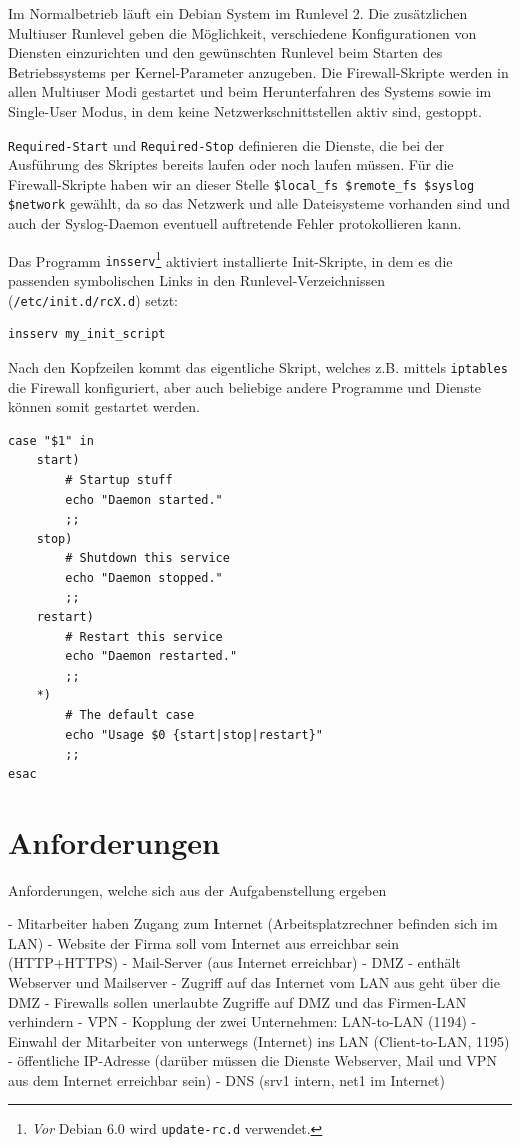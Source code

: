 \noindent Im Normalbetrieb läuft ein Debian System im Runlevel 2.
Die zusätzlichen Multiuser Runlevel geben die Möglichkeit, verschiedene
Konfigurationen von Diensten einzurichten und den gewünschten Runlevel beim
Starten des Betriebssystems per Kernel-Parameter anzugeben.
Die Firewall-Skripte werden in allen Multiuser Modi gestartet und beim
Herunterfahren des Systems sowie im Single-User Modus, in dem keine
Netzwerkschnittstellen aktiv sind, gestoppt.

{\tt Required-Start} und {\tt Required-Stop} definieren die Dienste, die bei
der Aus\-füh\-rung des Skriptes bereits laufen oder noch laufen müssen.
Für die Firewall-Skripte haben wir an dieser Stelle
\verb!$local_fs $remote_fs $syslog $network! gewählt, da so das Netzwerk und
alle Dateisysteme vorhanden sind und auch der Syslog-Daemon eventuell
auftretende Fehler protokollieren kann.

Das Programm {\tt insserv}\footnote{
\emph{Vor} Debian 6.0 wird {\tt update-rc.d} verwendet.
} aktiviert installierte Init-Skripte, in dem es die passenden symbolischen
Links in den Runlevel-Verzeichnissen ({\tt /etc/init.d/rcX.d}) setzt:

\begin{verbatim}
insserv my_init_script
\end{verbatim}

Nach den Kopfzeilen kommt das eigentliche Skript, welches z.B. mittels
{\tt iptables} die Firewall konfiguriert, aber auch beliebige andere Programme
und Dienste können somit gestartet werden.

\begin{lstlisting}[label=lst:lsb-script,caption={Init Script LSB: Eigentliches Skript.}]
case "$1" in
    start)
        # Startup stuff
        echo "Daemon started."
        ;;
    stop)
        # Shutdown this service
        echo "Daemon stopped."
        ;;
    restart)
        # Restart this service
        echo "Daemon restarted."
        ;;
    *)
        # The default case
        echo "Usage $0 {start|stop|restart}"
        ;;
esac
\end{lstlisting}


\section{Anforderungen}

Anforderungen, welche sich aus der Aufgabenstellung ergeben

- Mitarbeiter haben Zugang zum Internet (Arbeitsplatzrechner befinden sich im LAN)
- Website der Firma soll vom Internet aus erreichbar sein (HTTP+HTTPS)
- Mail-Server (aus Internet erreichbar)
- DMZ
  - enthält Webserver und Mailserver
  - Zugriff auf das Internet vom LAN aus geht über die DMZ
- Firewalls sollen unerlaubte Zugriffe auf DMZ und das Firmen-LAN verhindern
- VPN
  - Kopplung der zwei Unternehmen: LAN-to-LAN (1194)
  - Einwahl der Mitarbeiter von unterwegs (Internet) ins LAN (Client-to-LAN, 1195)
- öffentliche IP-Adresse (darüber müssen die Dienste Webserver, Mail und VPN aus dem Internet erreichbar sein)
- DNS (srv1 intern, net1 im Internet)


